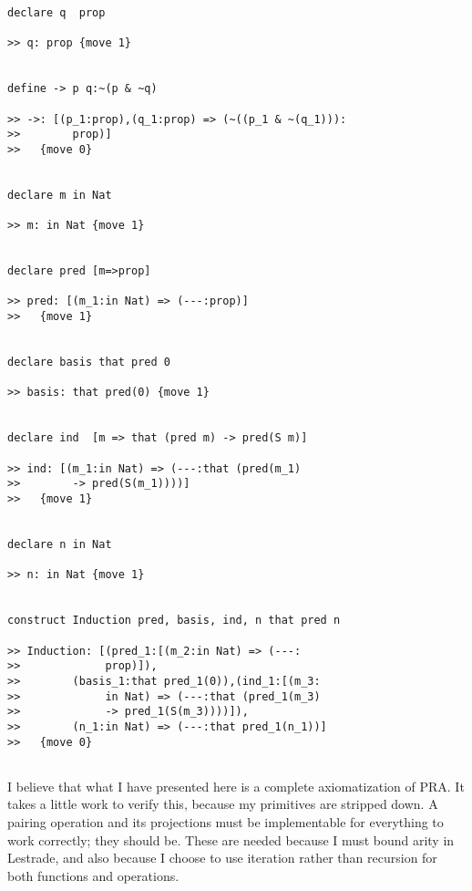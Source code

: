 \documentclass[12pt]{article}
\begin{document}
\begin{verbatim}
declare q  prop

>> q: prop {move 1}


define -> p q:~(p & ~q)

>> ->: [(p_1:prop),(q_1:prop) => (~((p_1 & ~(q_1))):
>>        prop)]
>>   {move 0}


declare m in Nat

>> m: in Nat {move 1}


declare pred [m=>prop]

>> pred: [(m_1:in Nat) => (---:prop)]
>>   {move 1}


declare basis that pred 0

>> basis: that pred(0) {move 1}


declare ind  [m => that (pred m) -> pred(S m)]

>> ind: [(m_1:in Nat) => (---:that (pred(m_1) 
>>        -> pred(S(m_1))))]
>>   {move 1}


declare n in Nat

>> n: in Nat {move 1}


construct Induction pred, basis, ind, n that pred n

>> Induction: [(pred_1:[(m_2:in Nat) => (---:
>>             prop)]),
>>        (basis_1:that pred_1(0)),(ind_1:[(m_3:
>>             in Nat) => (---:that (pred_1(m_3) 
>>             -> pred_1(S(m_3))))]),
>>        (n_1:in Nat) => (---:that pred_1(n_1))]
>>   {move 0}


\end{verbatim}

I believe that what I have presented here is a complete axiomatization of PRA.  It takes a little work to verify this, because my primitives are stripped down.  A pairing operation and its projections must be implementable for everything to work correctly;  they should be.  These are needed because I must bound arity in Lestrade, and also because I choose to use iteration rather than recursion for both functions and operations.
\end{document}
